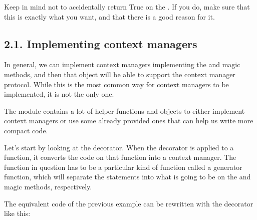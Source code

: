 \documentclass[a4paper,10pt,english]{sphinxmanual}
\begin{document}
Keep in mind not to accidentally return True on the . If you do, make sure that this is exactly what you
want, and that there is a good reason for it.


\subsection{2.1. Implementing context managers}
\label{\detokenize{chapters/2_pythonic_code/index:implementing-context-managers}}
In general, we can implement context managers implementing the  and  magic methods, and then
that object will be able to support the context manager protocol. While this is the most common way for context managers
to be implemented, it is not the only one.

The  module contains a lot of helper functions and objects to either implement context managers or use
some already provided ones that can help us write more compact code.

Let’s start by looking at the  decorator. When the  decorator is applied
to a function, it converts the code on that function into a context manager. The function in question has to be a
particular kind of function called a generator function, which will separate the statements into what is going to be on
the  and  magic methods, respectively.

The equivalent code of the previous example can be rewritten with the  decorator like this:

\begin{sphinxVerbatim}[commandchars=\\\{\}]
 

 

 
\end{sphinxVerbatim}
\end{document}
